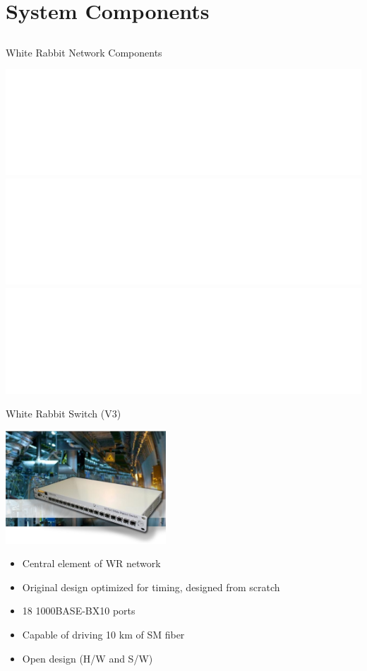 \documentclass[compress,red]{beamer}
\begin{document}
\section{System Components}
\subsection{}
\begin{frame}{White Rabbit Network Components}


    \begin{center}
    \includegraphics<1>[width=1.0\textwidth]{network/WRnetwork-eva.pdf}  \pause
    \includegraphics<2>[width=1.0\textwidth]{network/WRNcomponents-1.pdf} \pause
    \includegraphics<3>[width=1.0\textwidth]{network/WRNcomponents-2.pdf}
    \end{center}

\end{frame}
\begin{frame}{White Rabbit Switch (V3)}

    \begin{center}
    \includegraphics[width=6.0cm]{switch/wrSwitchV3.jpg}
    \end{center}

	\begin{itemize}
	\item Central element of WR network
	\item Original design optimized for timing, designed from scratch
	\item 18 1000BASE-BX10 ports
	\item Capable of driving 10 km of SM fiber
	\item Open design (H/W and S/W)
	\end{itemize}

\end{frame}
\end{document}
